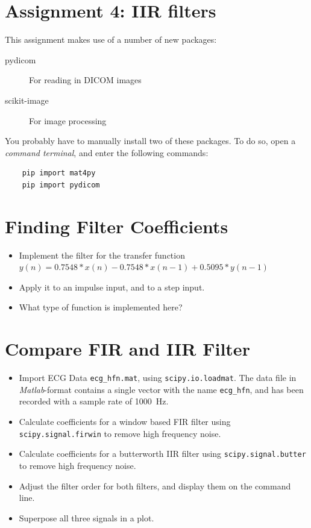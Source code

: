 \documentclass[12pt]{article}
\begin{document}
\section*{Assignment 4: IIR filters}

This assignment makes use of a number of new packages:

\begin{description}
    \item[pydicom] For reading in DICOM images
    \item[scikit-image] For image processing
\end{description}

You probably have to manually install two of these packages. To do so, open a
\emph{command terminal}, and enter the following commands:
\begin{lstlisting}
    pip import mat4py
    pip import pydicom
\end{lstlisting}


\section{Finding Filter Coefficients}

\begin{itemize}
    \item Implement the filter for the transfer function \\
        $y(n) = 0.7548 * x(n) - 0.7548 * x(n-1) + 0.5095 * y(n-1)$
    \item Apply it to an impulse input, and to a step input.
    \item What type of function is implemented here?
\end{itemize}


\section{Compare FIR and IIR Filter}

\begin{itemize}
    \item Import ECG Data \lstinline{ecg_hfn.mat}, using
        \lstinline{scipy.io.loadmat}. The data file in
        \emph{Matlab}-format contains a single vector with the name
        \texttt{ecg\_hfn}, and has been recorded with a sample rate of
        \SI{1000}{Hz}.

    \item Calculate coefficients for a window based FIR filter using
        \lstinline{scipy.signal.firwin} to remove high frequency noise.

    \item Calculate coefficients for a butterworth  IIR filter using
        \lstinline{scipy.signal.butter} to remove high frequency noise.

    \item Adjust the filter order for both filters, and display them on the
        command line.
        
    \item Superpose all three signals in a plot.
\end{itemize}
\end{document}
